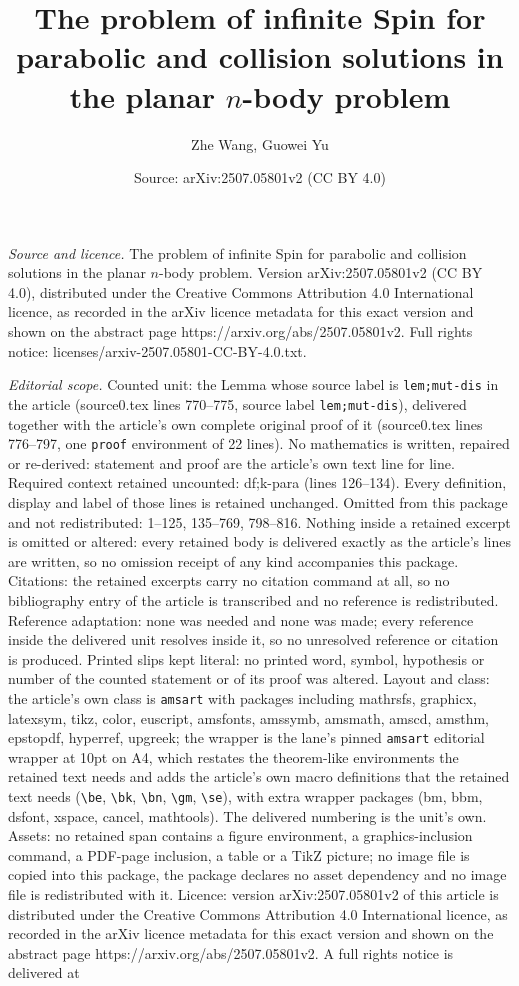 \documentclass[10pt,a4paper]{amsart}
\title[The problem of infinite Spin for parabolic and collision sol]{The problem of infinite Spin for parabolic and collision solutions in the planar $n$-body problem}
\author{Zhe Wang, Guowei Yu}
\date{Source: arXiv:2507.05801v2 (CC BY 4.0)}
\begin{document}
\maketitle

\noindent\emph{Source and licence.} The problem of infinite Spin for parabolic and collision solutions in the planar $n$-body problem. Version arXiv:2507.05801v2 (CC BY 4.0), distributed under the Creative Commons Attribution 4.0 International licence, as recorded in the arXiv licence metadata for this exact version and shown on the abstract page https://arxiv.org/abs/2507.05801v2. Full rights notice: licenses/arxiv-2507.05801-CC-BY-4.0.txt.\par\smallskip

\noindent\textit{Editorial scope.} Counted unit: the Lemma whose source label is \texttt{lem;mut-dis} in the article (source0.tex lines 770--775, source label \texttt{lem;mut-dis}), delivered together with the article's own complete original proof of it (source0.tex lines 776--797, one \texttt{proof} environment of 22 lines). No mathematics is written, repaired or re-derived: statement and proof are the article's own text line for line. Required context retained uncounted: df;k-para (lines 126--134). Every definition, display and label of those lines is retained unchanged. Omitted from this package and not redistributed: 1--125, 135--769, 798--816. Nothing inside a retained excerpt is omitted or altered: every retained body is delivered exactly as the article's lines are written, so no omission receipt of any kind accompanies this package. Citations: the retained excerpts carry no citation command at all, so no bibliography entry of the article is transcribed and no reference is redistributed. Reference adaptation: none was needed and none was made; every reference inside the delivered unit resolves inside it, so no unresolved reference or citation is produced. Printed slips kept literal: no printed word, symbol, hypothesis or number of the counted statement or of its proof was altered. Layout and class: the article's own class is \texttt{amsart} with packages including mathrsfs, graphicx, latexsym, tikz, color, euscript, amsfonts, amssymb, amsmath, amscd, amsthm, epstopdf, hyperref, upgreek; the wrapper is the lane's pinned \texttt{amsart} editorial wrapper at 10pt on A4, which restates the theorem-like environments the retained text needs and adds the article's own macro definitions that the retained text needs (\texttt{\textbackslash be}, \texttt{\textbackslash bk}, \texttt{\textbackslash bn}, \texttt{\textbackslash gm}, \texttt{\textbackslash se}), with extra wrapper packages (bm, bbm, dsfont, xspace, cancel, mathtools). The delivered numbering is the unit's own. Assets: no retained span contains a figure environment, a graphics-inclusion command, a PDF-page inclusion, a table or a TikZ picture; no image file is copied into this package, the package declares no asset dependency and no image file is redistributed with it. Licence: version arXiv:2507.05801v2 of this article is distributed under the Creative Commons Attribution 4.0 International licence, as recorded in the arXiv licence metadata for this exact version and shown on the abstract page https://arxiv.org/abs/2507.05801v2. A full rights notice is delivered at 
\end{document}
